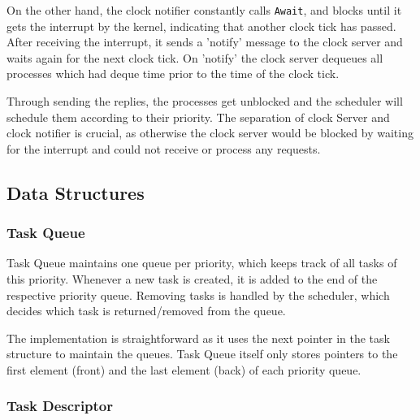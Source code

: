 \documentclass[12pt, titlepage]{article}
\begin{document}
    On the other hand, the clock notifier constantly calls \verb`Await`, and blocks until it gets the interrupt by the kernel, indicating that another clock tick has passed. 
    After receiving the interrupt, it sends a 'notify' message to the clock server and waits again for the next clock tick. 
    On 'notify' the clock server dequeues all processes which had deque time prior to the time of the clock tick.

    Through sending the replies, the processes get unblocked and the scheduler will schedule them according to their priority. 
    The separation of clock Server and clock notifier is crucial, as otherwise the clock server would be blocked by waiting for the interrupt and could not receive or process any requests. 

    \subsection{Data Structures}

    \subsubsection{Task Queue}
    \label{sec:task-queue}

    Task Queue maintains one queue per priority, which keeps track of all tasks of this priority.
    Whenever a new task is created, it is added to the end of the respective priority queue.
    Removing tasks is handled by the scheduler, which decides which task is returned/removed from the queue.

    The implementation is straightforward as it uses the next pointer in the task structure to maintain the queues.
    Task Queue itself only stores pointers to the first element (front) and the last element (back) of each priority queue.

    \subsubsection{Task Descriptor}
\end{document}
